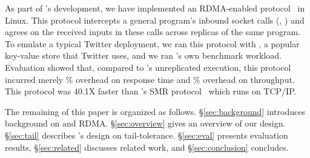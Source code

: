 As part of \xxx's development, we have implemented an RDMA-enabled \paxos 
protocol~\cite{falcon:github} in Linux. This protocol intercepts a general 
program's inbound socket calls (\eg, \recv) and agrees on the received inputs 
in these calls across replicas of the same program. To emulate a typical 
Twitter deployment, we ran this protocol with \redis, a popular key-value store 
that Twitter uses, and we ran \redis's own benchmark workload. Evaluation 
showed that, compared to \redis's unreplicated execution, this protocol 
incurred merely \latencyoverhead\% overhead on response time and 
\tputoverhead\% overhead on throughput. This protocol was 40.1X faster 
than \zookeeper's SMR protocol~\cite{calvin:sigmod12} which runs on TCP/IP.


The remaining of this paper is organized as follows. \S\ref{sec:background} 
introduces background on \paxos and RDMA. \S\ref{sec:overview} gives an 
overview of our \xxx design. \S\ref{sec:tail} describes \xxx's design on 
tail-tolerance. \S\ref{sec:eval} presents evaluation results, 
\S\ref{sec:related} discusses related work, and \S\ref{sec:conclusion} 
concludes.   


